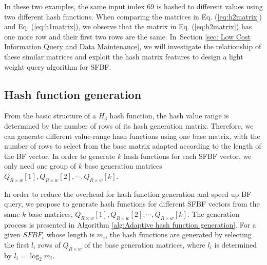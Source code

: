 \documentclass[10pt,journal,compsoc]{IEEEtran}
\begin{document}
In these two examples, the same input index 69 is hashed to different values using two different hash functions. When comparing the matrices in Eq. (\ref{eq:h2matrix}) and Eq. (\ref{eq:h1matrix}), we observe that the matrix in Eq. (\ref{eq:h2matrix}) has one more row and their first two rows are the same. In~Section \ref{sec: Low Cost Information Query and Data Maintenance}, we will investigate the relationship of these
similar matrices and exploit the hash matrix features to design a light weight query algorithm for SFBF.

\subsection{Hash function generation}
From the basic structure of a $H_3$ hash function, the hash value range is determined by the number of rows of its hash generation matrix. Therefore, we can generate different value-range hash functions using one base matrix, with the number of rows to select from the base matrix adapted according to the length of the BF vector.  In order to generate $k$ hash functions for each SFBF vector, we only need one group of  $k$ base generation matrices ${Q_{R \times w}}[1],{Q_{R \times w}}[2], \cdots ,{Q_{R \times w}}[k]$.

In order to reduce the overhead for hash function generation and speed up BF query, we propose to generate hash functions for different SFBF vectors from the same $k$ base matrices, ${Q_{R \times w}}[1],{Q_{R \times w}}[2], \cdots ,{Q_{R \times w}}[k]$. The generation process is presented in Algorithm \ref{alg:Adaptive hash function generation}. For a given $SFBF_i$ whose length is $m_i$, the hash functions are generated by selecting the first $l_i$ rows of ${Q_{R \times w}}$ of the base generation matrices, where $l_i$ is determined by $l_i = {\log _2}{m_i}$.
\end{document}
